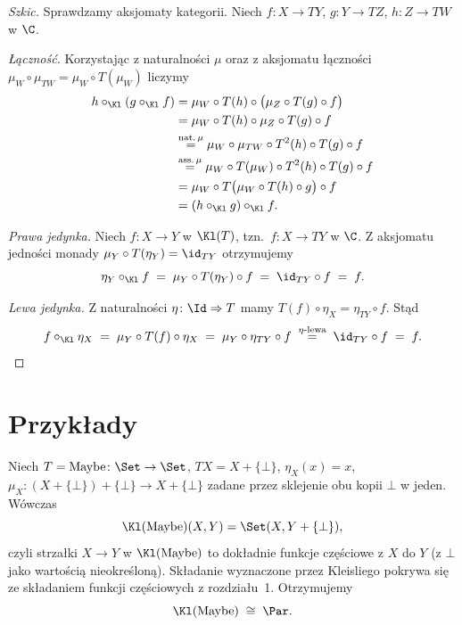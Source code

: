 \begin{proof}[Szkic]
Sprawdzamy aksjomaty kategorii. Niech $f\colon X\to TY$, $g\colon Y\to TZ$, $h\colon Z\to TW$ w $\C$.

\emph{Łączność.} Korzystając z naturalności $\mu$ oraz z aksjomatu łączności $\mu_W\circ\mu_{TW} = \mu_W\circ T(\mu_W)$ liczymy
\begin{align*}
h\circ_{\Kl}(g\circ_{\Kl} f) &= \mu_W \circ T(h) \circ \bigl(\mu_Z\circ T(g)\circ f\bigr) \\
 &= \mu_W \circ T(h)\circ \mu_Z \circ T(g)\circ f \\
 &\stackrel{\mathrm{nat.}\,\mu}{=} \mu_W \circ \mu_{TW} \circ T^2(h) \circ T(g)\circ f \\
 &\stackrel{\mathrm{ass.}\,\mu}{=} \mu_W \circ T(\mu_W) \circ T^2(h) \circ T(g)\circ f \\
 &= \mu_W \circ T\bigl(\mu_W \circ T(h)\circ g\bigr) \circ f \\
 &= (h\circ_{\Kl} g)\circ_{\Kl} f.
\end{align*}

\emph{Prawa jedynka.} Niech $f\colon X\to Y$ w $\Kl(T)$, tzn.\ $f\colon X\to TY$ w $\C$. Z aksjomatu jedności monady $\mu_Y \circ T(\eta_Y) = \id_{TY}$ otrzymujemy
\[
\eta_Y \circ_{\Kl} f \;=\; \mu_Y \circ T(\eta_Y) \circ f \;=\; \id_{TY}\circ f \;=\; f.
\]

\emph{Lewa jedynka.} Z naturalności $\eta\colon \Id\Rightarrow T$ mamy $T(f)\circ \eta_X = \eta_{TY}\circ f$. Stąd
\[
f \circ_{\Kl} \eta_X \;=\; \mu_Y \circ T(f) \circ \eta_X \;=\; \mu_Y \circ \eta_{TY}\circ f \;\stackrel{\eta\text{-lewa}}{=}\; \id_{TY}\circ f \;=\; f. \qedhere
\]
\end{proof}

\section{Przykłady}

\begin{przyklad}
Niech $T = \mathrm{Maybe}\colon \Set\to\Set$, $TX = X+\{\bot\}$, $\eta_X(x)=x$, $\mu_X\colon (X+\{\bot\})+\{\bot\}\to X+\{\bot\}$ zadane przez sklejenie obu kopii $\bot$ w jeden. Wówczas
\[
\Kl(\mathrm{Maybe})(X,Y) = \Set(X, Y+\{\bot\}),
\]
czyli strzałki $X\to Y$ w $\Kl(\mathrm{Maybe})$ to dokładnie funkcje częściowe z $X$ do $Y$ (z $\bot$ jako wartością nieokreśloną). Składanie wyznaczone przez Kleisliego pokrywa się ze składaniem funkcji częściowych z rozdziału~1. Otrzymujemy
\[
\Kl(\mathrm{Maybe}) \;\cong\; \Par.
\]
\end{przyklad}

